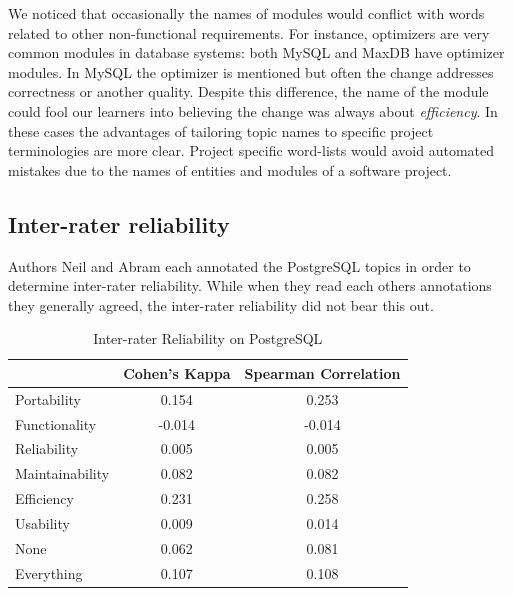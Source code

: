 \documentclass[smallextended]{svjour3}       %
\begin{document}
We noticed that occasionally the names of modules would conflict with words related to other non-functional requirements. 
For instance, optimizers are very common modules in database systems: both MySQL and MaxDB have optimizer modules. 
In MySQL the optimizer is mentioned but often the change addresses  correctness or another quality. 
Despite this difference, the name of the module could fool our learners into believing the change was always about \emph{efficiency}. 
In these cases the advantages of tailoring topic names to specific project terminologies are more clear. 
Project specific word-lists would avoid automated mistakes due to the names of entities and modules of a software project.

\subsection{Inter-rater reliability}

Authors Neil and Abram each annotated the PostgreSQL topics in order
to determine inter-rater reliability. While when they read each others
annotations they generally agreed, the inter-rater reliability did not
bear this out.



\begin{table}
\centering
\begin{tabular}{l|c|c}
\hline
            & Cohen's Kappa & Spearman Correlation \\ \hline
Portability & 0.154 & 0.253  \\
Functionality & -0.014 & -0.014 \\
Reliability & 0.005 & 0.005 \\
Maintainability & 0.082 & 0.082 \\
Efficiency & 0.231 & 0.258 \\
Usability & 0.009 & 0.014 \\
None &      0.062 & 0.081 \\ \hline 
Everything & 0.107 & 0.108 \\ \hline
\end{tabular}
\caption{Inter-rater Reliability on PostgreSQL}
\label{tab:interr}
\end{table}
\end{document}
